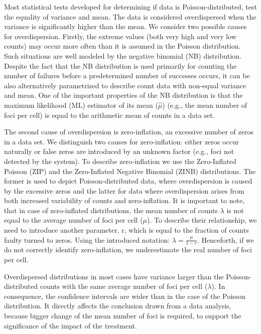 Most statistical tests developed for determining if data is Poisson-distributed, test the equality of variance and mean. The data is considered overdispersed when the variance is significantly higher than the mean. We consider two possible causes for overdispersion. Firstly, the extreme values (both very high and very low counts) may occur more often than it is assumed in the Poisson distribution. Such situations are well modeled by the negative binomial (NB) distribution. Despite the fact that the NB distribution is used primarily for counting the number of failures before a predetermined number of successes occurs, it can be also alternatively parametrized to describe count data with non-equal variance and mean. One of the important properties of the NB distribution is that the maximum likelihood (ML) estimator of its mean ($\hat{\mu}$) (e.g., the mean number of foci per cell) is equal to the arithmetic mean of counts in a data set.

The second cause of overdispersion is zero-inflation, an excessive number of zeros in a data set. We distinguish two causes for zero-inflation: either zeros occur naturally or false zeros are introduced by an unknown factor (e.g., foci not detected by the system). To describe zero-inflation we use the Zero-Inflated Poisson (ZIP) and the Zero-Inflated Negative Binomial (ZINB) distributions. The former is used to depict Poisson-distributed data, where overdispersion is caused by the excessive zeros and the latter for data where overdispersion arises from both increased variability of counts and zero-inflation. It is important to note, that in case of zero-inflated distributions, the mean number of counts $\lambda$ is not equal to the average number of foci per cell ($\mu$). To describe their relationship, we need to introduce another parameter, r, which is equal to the fraction of counts faulty turned to zeros. Using the introduced notation: $\lambda = \frac{\mu}{1 - r}$. Henceforth, if we do not correctly identify zero-inflation, we underestimate the real number of foci per cell.

Overdispersed distributions in most cases have variance larger than the Poisson-distributed counts with the same average number of foci per cell ($\lambda$). In consequence, the confidence intervals are wider than in the case of the Poisson distribution. It directly affects the conclusion drawn from a data analysis, because bigger change of the mean number of foci is required, to support the significance of the impact of the treatment. 

